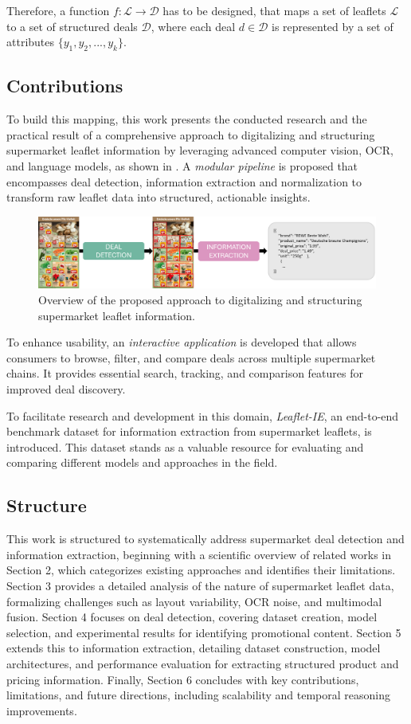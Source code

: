 \documentclass[11pt]{article}
\begin{document}
Therefore, a function $f: \mathcal{L} \to \mathcal{D}$ has to be designed, that maps a set of leaflets $\mathcal{L}$ to a set of structured deals $\mathcal{D}$, where each deal $d \in \mathcal{D}$ is represented by a set of attributes $\{y_1, y_2, ..., y_k\}$.


\subsection{Contributions}
To build this mapping, this work presents the conducted research and the practical result of a comprehensive approach to digitalizing and structuring supermarket leaflet information by leveraging advanced computer vision, OCR, and language models, as shown in . A \emph{modular pipeline} is proposed that encompasses deal detection, information extraction and normalization to transform raw leaflet data into structured, actionable insights.

\begin{figure}
    \centering
    \includegraphics[width=0.8\linewidth]{figures/overview.png}
    \caption{Overview of the proposed approach to digitalizing and structuring supermarket leaflet information.}
    \label{fig:overview}
\end{figure}

To enhance usability, an \emph{interactive application} is developed that allows consumers to browse, filter, and compare deals across multiple supermarket chains. It provides essential search, tracking, and comparison features for improved deal discovery.

To facilitate research and development in this domain, \emph{Leaflet-IE}, an end-to-end benchmark dataset for information extraction from supermarket leaflets, is introduced. This dataset stands as a valuable resource for evaluating and comparing different models and approaches in the field.

\subsection{Structure}
This work is structured to systematically address supermarket deal detection and information extraction, beginning with a scientific overview of related works in Section 2, which categorizes existing approaches and identifies their limitations. Section 3 provides a detailed analysis of the nature of supermarket leaflet data, formalizing challenges such as layout variability, OCR noise, and multimodal fusion. Section 4 focuses on deal detection, covering dataset creation, model selection, and experimental results for identifying promotional content. Section 5 extends this to information extraction, detailing dataset construction, model architectures, and performance evaluation for extracting structured product and pricing information. Finally, Section 6 concludes with key contributions, limitations, and future directions, including scalability and temporal reasoning improvements.
\end{document}
